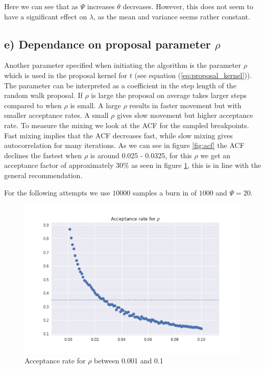 \documentclass[a4paper]{article}
\begin{document}
Here we can see that as $\Psi$ increases $\theta$ decreases. However, this does not seem to have a significant effect on $\lambda$, as the mean and variance seems rather constant.

\subsection*{e) Dependance on proposal parameter $\rho$}
Another parameter specified when initiating the algorithm is the parameter $\rho$ which is used in the proposal kernel for $t$ (see equation (\ref{eq:proposal_kernel})). The parameter can be interpreted as a coefficient in the step length of the random walk proposal. If $\rho$ is large the proposal on average takes larger steps compared to when $\rho$ is small. A large $\rho$ results in faster movement but with smaller acceptance rates. A small $\rho$ gives slow movement but higher acceptance rate. To measure the mixing we look at the ACF for the sampled breakpoints. Fast mixing implies that the ACF decreases fast, while slow mixing gives autocorrelation for many iterations. As we can see in figure \ref{fig:acf} the ACF declines the fastest when $\rho$ is around 0.025 - 0.0325, for this $\rho$ we get an acceptance factor of approximately 30\% as seen in figure \ref{fig:accept_rho}, this is in line with the general recommendation.

For the following attempts we use $10 000$ samples a burn in of $1000$ and $\Psi = 20$.

\begin{figure}[H]
    \centering
    \includegraphics[width = 1.0\textwidth]{images/accept_rho.png} 
    \caption{Acceptance rate for $\rho$ between 0.001 and 0.1}
    \label{fig:accept_rho}
\end{figure}
\end{document}
